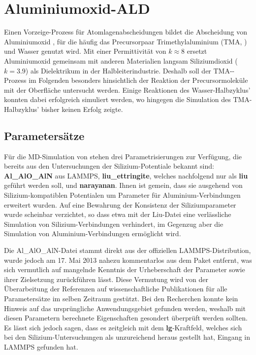 \section{Aluminiumoxid-ALD}
\label{aluminaald}

Einen Vorzeige-Prozess für Atomlagenabscheidungen bildet die Abscheidung von Aluminiumoxid \cite{puurunen_surface_2005}, für die häufig das Precursorpaar Trimethylaluminium (TMA, ) und Wasser genutzt wird.
Mit einer Permittivität von $k\approx 8$ ersetzt Aluminiumoxid gemeinsam mit anderen Materialien langsam Siliziumdioxid ($k=3.9$) als Dielektrikum in der Halbleiterindustrie.
Deshalb soll der TMA--Prozess im Folgenden besonders hinsichtlich der Reaktion der Precursormoleküle mit der Oberfläche untersucht werden.
Einige Reaktionen des Wasser-Halbzyklus' konnten dabei erfolgreich simuliert werden, wo hingegen die Simulation des TMA-Halbzyklus' bisher keinen Erfolg zeigte.

\subsection{Parametersätze}

Für die MD-Simulation von  stehen drei Parametrisierungen zur Verfügung, die bereits aus den Untersuchungen der Silizium-Potentiale bekannt sind:\\
\textbf{Al\_AlO\_AlN} aus LAMMPS\cite{plimpton_lammps_2014}, \textbf{liu\_ettringite}\cite{liu_development_2012}, welches nachfolgend nur als \textbf{liu} geführt werden soll, und \textbf{narayanan}\cite{narayanan_reactive_2012}.
Ihnen ist gemein, dass sie ausgehend von Silizium-kompatiblen Potentialen um Parameter für Aluminium-Verbindungen erweitert wurden.
Auf eine Bewahrung der Konsistenz der Siliziumparameter wurde scheinbar verzichtet, so dass etwa mit der Liu-Datei eine verlässliche Simulation von  Silizium-Verbindungen verhindert, im Gegenzug aber die Simulation von Aluminium-Verbindungen ermöglicht wird.

Die Al\_AlO\_AlN-Datei stammt direkt aus der offiziellen LAMMPS-Distribution, wurde jedoch am 17. Mai 2013 nahezu kommentarlos aus dem Paket entfernt, was sich vermutlich auf mangelnde Kenntnis der Urheberschaft der Parameter sowie ihrer Zielsetzung zurückführen lässt.
Diese Vermutung wird von der Überarbeitung der Referenzen auf wissenschaftliche Publikationen für alle Parametersätze im selben Zeitraum gestützt.
Bei den Recherchen konnte kein Hinweis auf das ursprüngliche Anwendungsgebiet gefunden werden, weshalb mit diesen Parametern berechnete Eigenschaften gesondert überprüft werden sollten.
Es lässt sich jedoch sagen, dass es zeitgleich mit dem \textbf{lg}-Kraftfeld, welches sich bei den Silizium-Untersuchungen als unzureichend heraus gestellt hat, Eingang in LAMMPS gefunden hat.

